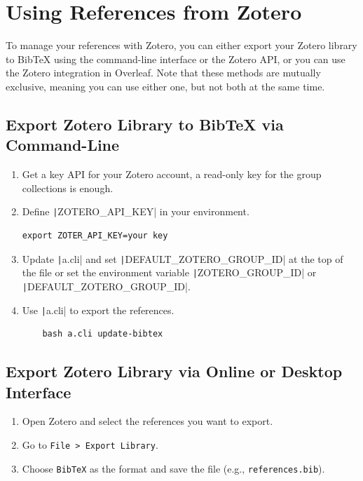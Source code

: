 \documentclass[a4paper]{article}
\begin{document}
\section{Using References from Zotero}

To manage your references with Zotero, you can either export your Zotero library to BibTeX using the command-line interface or the Zotero API, or you can use the Zotero integration in Overleaf.
Note that these methods are mutually exclusive, meaning you can use either one, but not both at the same time.

\subsection{Export Zotero Library to BibTeX via Command-Line}
\label{sec:export-zotero-library:cli}
\begin{enumerate}
    \item Get a key API for your Zotero account, a read-only key for the group collections is enough.
    \item Define \texttt|ZOTERO_API_KEY| in your environment.
\begin{verbatim}
export ZOTER_API_KEY=your key
\end{verbatim}
    \item Update \texttt|a.cli| and set \texttt|DEFAULT_ZOTERO_GROUP_ID| at the top of the file or set the environment variable \texttt|ZOTERO_GROUP_ID| or \texttt|DEFAULT_ZOTERO_GROUP_ID|.
    \item Use \texttt|a.cli| to export the references.
\begin{verbatim}
    bash a.cli update-bibtex
\end{verbatim}
\end{enumerate}

\subsection{Export Zotero Library via Online or Desktop Interface}
\label{sec:export-zotero-library:interface}
\begin{enumerate}
    \item Open Zotero and select the references you want to export.
    \item Go to \texttt{File > Export Library}.
    \item Choose \texttt{BibTeX} as the format and save the file (e.g., \texttt{references.bib}).
\end{enumerate}
\end{document}
